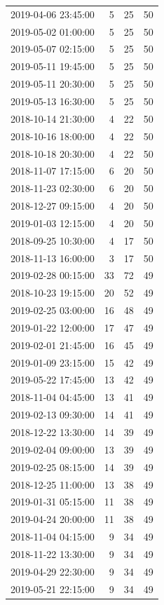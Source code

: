 \begin{tabular}{lrrr}
2019-04-06 23:45:00 & 5 & 25 & 50 \\
2019-05-02 01:00:00 & 5 & 25 & 50 \\
2019-05-07 02:15:00 & 5 & 25 & 50 \\
2019-05-11 19:45:00 & 5 & 25 & 50 \\
2019-05-11 20:30:00 & 5 & 25 & 50 \\
2019-05-13 16:30:00 & 5 & 25 & 50 \\
2018-10-14 21:30:00 & 4 & 22 & 50 \\
2018-10-16 18:00:00 & 4 & 22 & 50 \\
2018-10-18 20:30:00 & 4 & 22 & 50 \\
2018-11-07 17:15:00 & 6 & 20 & 50 \\
2018-11-23 02:30:00 & 6 & 20 & 50 \\
2018-12-27 09:15:00 & 4 & 20 & 50 \\
2019-01-03 12:15:00 & 4 & 20 & 50 \\
2018-09-25 10:30:00 & 4 & 17 & 50 \\
2018-11-13 16:00:00 & 3 & 17 & 50 \\
2019-02-28 00:15:00 & 33 & 72 & 49 \\
2018-10-23 19:15:00 & 20 & 52 & 49 \\
2019-02-25 03:00:00 & 16 & 48 & 49 \\
2019-01-22 12:00:00 & 17 & 47 & 49 \\
2019-02-01 21:45:00 & 16 & 45 & 49 \\
2019-01-09 23:15:00 & 15 & 42 & 49 \\
2019-05-22 17:45:00 & 13 & 42 & 49 \\
2018-11-04 04:45:00 & 13 & 41 & 49 \\
2019-02-13 09:30:00 & 14 & 41 & 49 \\
2018-12-22 13:30:00 & 14 & 39 & 49 \\
2019-02-04 09:00:00 & 13 & 39 & 49 \\
2019-02-25 08:15:00 & 14 & 39 & 49 \\
2018-12-25 11:00:00 & 13 & 38 & 49 \\
2019-01-31 05:15:00 & 11 & 38 & 49 \\
2019-04-24 20:00:00 & 11 & 38 & 49 \\
2018-11-04 04:15:00 & 9 & 34 & 49 \\
2018-11-22 13:30:00 & 9 & 34 & 49 \\
2019-04-29 22:30:00 & 9 & 34 & 49 \\
2019-05-21 22:15:00 & 9 & 34 & 49 \\

\end{tabular}
